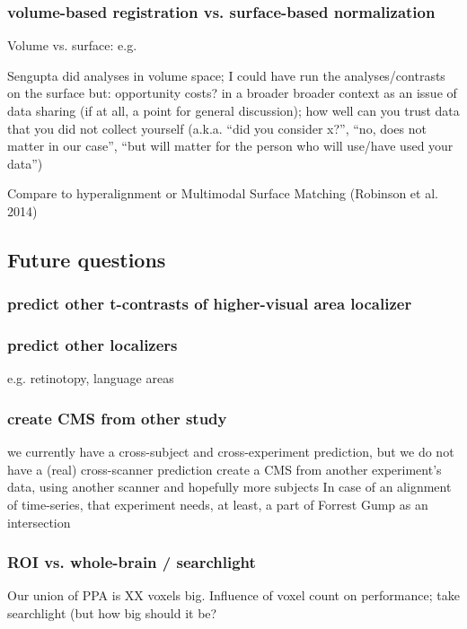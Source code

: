 \subsubsection{volume-based registration vs. surface-based normalization}
%
Volume vs. surface: e.g. \citep{desai2005volumetric}

Sengupta did analyses in volume space;
%
I could have run the analyses/contrasts on the surface
%
but: opportunity costs?
%
in a broader broader context as an issue of data sharing (if at all, a point for
general discussion); how well can you trust data that you did not collect
yourself (a.k.a. ``did you consider x?'', ``no, does not matter in our case'',
``but will matter for the person who will use/have used your data'')

Compare to hyperalignment or Multimodal Surface Matching (Robinson et al. 2014)


\subsection{Future questions}


\subsubsection{predict other t-contrasts of higher-visual area localizer}

\subsubsection{predict other localizers}
%
e.g. retinotopy, language areas


\subsubsection{create CMS from other study}
%
we currently have a cross-subject and cross-experiment prediction,
but we do not have a (real) cross-scanner prediction
%
create a CMS from another experiment’s data,
using another scanner and hopefully more subjects
%
In case of an alignment of time-series,
that experiment needs, at least, a part of Forrest Gump as an intersection


\subsubsection{ROI vs. whole-brain / searchlight}
%
Our union of PPA is XX voxels big.
%
Influence of voxel count on performance; take searchlight (but how big should it
be?

